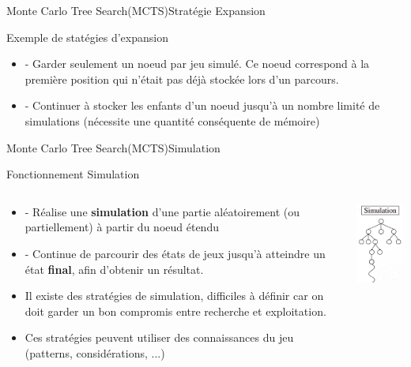 \begin{frame}{Monte Carlo Tree Search(MCTS)}{Stratégie Expansion}
	\begin{block}{Exemple de statégies d'expansion}
			\begin{itemize}
				\item - Garder seulement un noeud par jeu simulé. Ce noeud correspond à la première position qui n'était pas déjà stockée lors d'un parcours.
				\item - Continuer à stocker les enfants d'un noeud jusqu'à un nombre limité de simulations (nécessite une quantité conséquente de mémoire)
			\end{itemize}
	\end{block}
\end{frame}

\begin{frame}{Monte Carlo Tree Search(MCTS)}{Simulation}
	\begin{block}{Fonctionnement Simulation}
		\begin{columns}
			\begin{column}{7cm}
				\begin{itemize}
					\item - Réalise une \textbf{simulation} d'une partie aléatoirement (ou partiellement) à partir du noeud étendu
					\item - Continue de parcourir des états de jeux jusqu'à atteindre un état \textbf{final}, afin d'obtenir un résultat.
					\item Il existe des stratégies de simulation, difficiles à définir car on doit garder un bon compromis entre recherche et exploitation.
					\item Ces stratégies peuvent utiliser des connaissances du jeu (patterns, considérations, ...)
				\end{itemize}
			\end{column}
			\begin{column}{4cm}
				\includegraphics[width=3cm]{ressources/MCTS/Simulation.png}
			\end{column}
		\end{columns}
	\end{block}
\end{frame}

